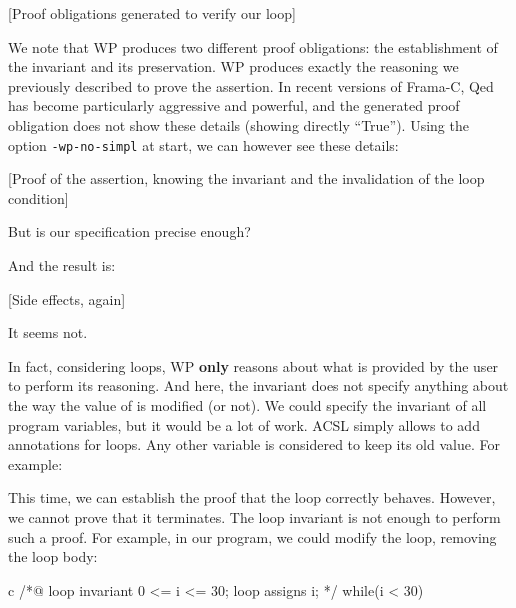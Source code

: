 [Proof obligations generated to verify our loop]


We note that WP produces two different proof obligations: the
establishment of the invariant and its preservation. WP produces exactly
the reasoning we previously described to prove the assertion. In recent
versions of Frama-C, Qed has become particularly aggressive and
powerful, and the generated proof obligation does not show these details
(showing directly ``True''). Using the option \texttt{-wp-no-simpl} at
start, we can however see these details:



[Proof of the assertion, knowing the invariant and the
  invalidation of the loop condition]


But is our specification precise enough?






And the result is:



[Side effects, again]


It seems not.





In fact, considering loops, WP \textbf{only} reasons about what is
provided by the user to perform its reasoning. And here, the invariant
does not specify anything about the way the value of  is
modified (or not). We could specify the invariant of all program
variables, but it would be a lot of work. ACSL simply allows to add
 annotations for loops. Any other variable is considered
to keep its old value. For example:






This time, we can establish the proof that the loop correctly behaves.
However, we cannot prove that it terminates. The loop invariant is not
enough to perform such a proof. For example, in our program, we could
modify the loop, removing the loop body:



\begin{CodeBlock}{c}
/*@
  loop invariant 0 <= i <= 30;
  loop assigns i;
*/
while(i < 30){
   
}
\end{CodeBlock}



